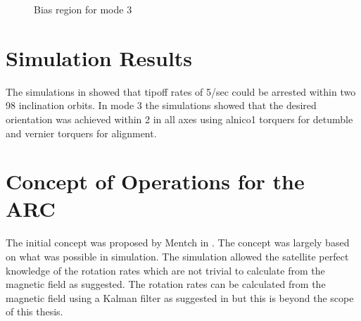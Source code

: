 \begin{figure}[htb!]
    \caption{Bias region for mode 3}
    \label{fig:m3b}
\end{figure}

\section{Simulation Results}

The simulations in \cite{Mentch11} showed that tipoff rates of 5\textdegree/sec could be arrested within two 98\textdegree{} inclination orbits. In mode 3 the simulations showed that the desired orientation was achieved within 2\textdegree{} in all axes using alnico1 torquers for detumble and vernier torquers for alignment.


\section{Concept of Operations for the \acl{ARC}}

The initial concept was proposed by Mentch in \cite{Mentch11}. The concept was largely based on what was possible in simulation. The simulation allowed the satellite perfect knowledge of the rotation rates which are not trivial to calculate from the magnetic field as suggested. The rotation rates can be calculated from the magnetic field using a Kalman filter as suggested in \cite{Sturm05} but this is beyond the scope of this thesis.

